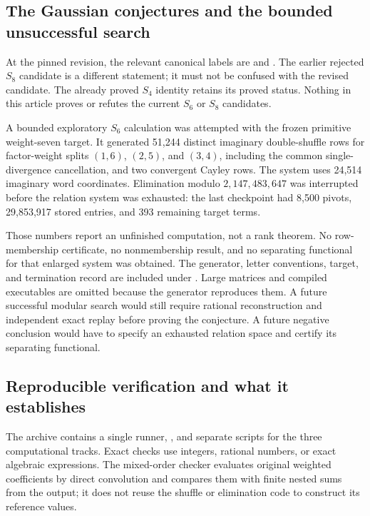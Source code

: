 \subsection{The Gaussian conjectures and the bounded unsuccessful search}

At the pinned revision, the relevant canonical labels are
 and  \cite{RepoMain}.
The earlier rejected $S_8$ candidate is a different statement; it
must not be confused with the revised candidate. The already proved
$S_4$ identity retains its proved status. Nothing in this article
proves or refutes the current $S_6$ or $S_8$ candidates.

A bounded exploratory $S_6$ calculation was attempted with the frozen
primitive weight-seven target. It generated 51,244 distinct imaginary
double-shuffle rows for factor-weight splits $(1,6)$, $(2,5)$, and
$(3,4)$, including the common single-divergence cancellation, and two
convergent Cayley rows. The system uses 24,514 imaginary word
coordinates. Elimination modulo $2,147,483,647$ was interrupted before
the relation system was exhausted: the last checkpoint had 8,500
pivots, 29,853,917 stored entries, and 393 remaining target terms.

Those numbers report an unfinished computation, not a rank theorem.
No row-membership certificate, no nonmembership result, and no
separating functional for that enlarged system was obtained. The
generator, letter conventions, target, and termination record are
included under . Large matrices and compiled
executables are omitted because the generator reproduces them.
A future successful modular search would still require rational
reconstruction and independent exact replay before proving the
conjecture. A future negative conclusion would have to specify an
exhausted relation space and certify its separating functional.

\subsection{Reproducible verification and what it establishes}

The archive contains a single runner, , and
separate scripts for the three computational tracks. Exact checks
use integers, rational numbers, or exact algebraic expressions.
The mixed-order checker evaluates original weighted coefficients by
direct convolution and compares them with finite nested sums from
the output; it does not reuse the shuffle or elimination code to
construct its reference values.

